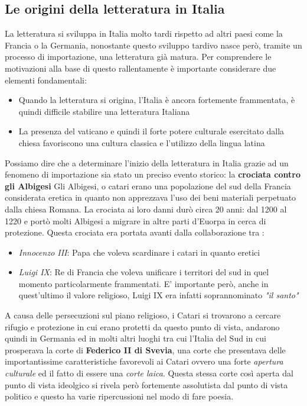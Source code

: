\documentclass[a4paper, 11pt]{article}
\begin{document}
\subsection{Le origini della letteratura in Italia}
La letteratura si sviluppa in Italia molto tardi rispetto ad altri paesi come la Francia o la Germania, nonostante questo sviluppo tardivo nasce però, tramite un processo di importazione, una letteratura già matura.
Per comprendere le motivazioni alla base di questo rallentamente è importante considerare due elementi fondamentali:
\begin{itemize}
    \item Quando la letteratura si origina, l'Italia è ancora fortemente frammentata, è quindi difficile stabilire una letteratura Italiana
    \item La presenza del vaticano e quindi il forte potere culturale esercitato dalla chiesa favoriscono una cultura classica e l'utilizzo della lingua latina
\end{itemize}
Possiamo dire che a determinare l'inizio della letteratura in Italia grazie ad un fenomeno di importazione sia stato un preciso evento storico: la \textbf{crociata contro gli Albigesi}
Gli Albigesi, o catari erano una popolazione del sud della Francia considerata eretica in quanto non apprezzava l'uso dei beni materiali perpetuato dalla chiesa Romana. La crociata ai loro danni durò circa 20 anni: dal 1200 al 1220 e portò molti Albigesi a migrare in altre parti d'Euorpa in cerca di protezione.
Questa crociata era portata avanti dalla collaborazione tra :
\begin{itemize}
    \item \textit{Innocenzo III}: Papa che voleva scardinare i catari in quanto eretici
    \item \textit{Luigi IX}: Re di Francia che voleva unificare i territori del sud in quel momento particolarmente frammentati. E' importante però, anche in quest'ultimo il valore religioso, Luigi IX era infatti soprannominato \textit{"il santo"}
\end{itemize}
A causa delle persecuzioni sul piano religioso, i Catari si trovarono a cercare rifugio e protezione in cui erano protetti da questo punto di vista, andarono quindi in Germania ed in molti altri luoghi tra cui l'Italia del Sud in cui prosperava la corte di \textbf{Federico II di Svevia}, una corte che presentava delle importantissime caratteristiche favorevoli ai Catari ovvero una forte \textit{apertura culturale} ed il fatto di essere una \textit{corte laica}.
Questa stessa corte così aperta dal punto di vista ideolgico si rivela però fortemente assolutista dal punto di vista politico e questo ha varie ripercussioni nel modo di fare poesia.
\end{document}

